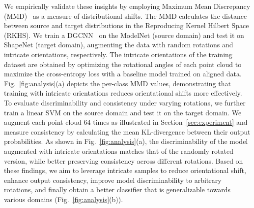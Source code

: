 We empirically validate these insights by employing Maximum Mean Discrepancy (MMD)~\cite{gretton2012kernel} as a measure of distributional shifts. The MMD calculates the distance between source and target distributions in the Reproducing Kernel Hilbert Space (RKHS). We train a DGCNN~\cite{wang2019dynamic} on the ModelNet (source domain) and test it on ShapeNet (target domain), augmenting the data with random rotations and intricate orientations, respectively. The intricate orientations of the training dataset are obtained by optimizing the rotational angles of each point cloud to maximize the cross-entropy loss with a baseline model trained on aligned data. Fig.~\ref{fig:analysis}(a) depicts the per-class MMD values, demonstrating that training with intricate orientations reduces orientational shifts more effectively. To evaluate discriminability and consistency under varying rotations, we further train a linear SVM on the source domain and test it on the target domain. We augment each point cloud 64 times as illustrated in Section~\ref{sec:experiment} and measure consistency by calculating the mean KL-divergence between their output probabilities. As shown in Fig.~\ref{fig:analysis}(a), the discriminability of the model augmented with intricate orientations matches that of the randomly rotated version, while better preserving consistency across different rotations.
Based on these findings, we aim to leverage intricate samples to reduce orientational shift, enhance output consistency, improve model discriminability to arbitrary rotations, and finally obtain a better classifier that is generalizable towards various domains (Fig.~\ref{fig:analysis}(b)).
